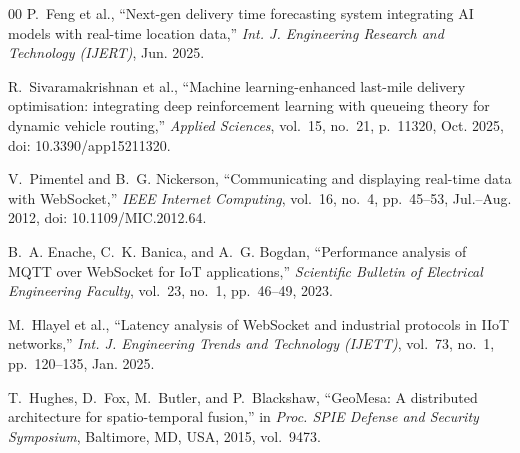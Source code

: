 \documentclass[conference]{IEEEtran}
\begin{document}
\begin{thebibliography}{00}
P.~Feng et al.,
``Next-gen delivery time forecasting system integrating AI models with
real-time location data,''
\textit{Int. J. Engineering Research and Technology (IJERT)},
Jun. 2025.

R.~Sivaramakrishnan et al.,
``Machine learning-enhanced last-mile delivery optimisation:
integrating deep reinforcement learning with queueing theory for
dynamic vehicle routing,''
\textit{Applied Sciences}, vol.~15, no.~21, p.~11320, Oct. 2025,
doi: 10.3390/app15211320.


V.~Pimentel and B.~G. Nickerson,
``Communicating and displaying real-time data with WebSocket,''
\textit{IEEE Internet Computing}, vol.~16, no.~4, pp.~45--53,
Jul.--Aug. 2012,
doi: 10.1109/MIC.2012.64.

B.~A. Enache, C.~K. Banica, and A.~G. Bogdan,
``Performance analysis of MQTT over WebSocket for IoT applications,''
\textit{Scientific Bulletin of Electrical Engineering Faculty},
vol.~23, no.~1, pp.~46--49, 2023.

M.~Hlayel et al.,
``Latency analysis of WebSocket and industrial protocols in IIoT
networks,''
\textit{Int. J. Engineering Trends and Technology (IJETT)},
vol.~73, no.~1, pp.~120--135, Jan. 2025.


T.~Hughes, D.~Fox, M.~Butler, and P.~Blackshaw,
``GeoMesa: A distributed architecture for spatio-temporal fusion,''
in \textit{Proc. SPIE Defense and Security Symposium}, Baltimore, MD,
USA, 2015, vol.~9473.

\end{thebibliography}
\end{document}
